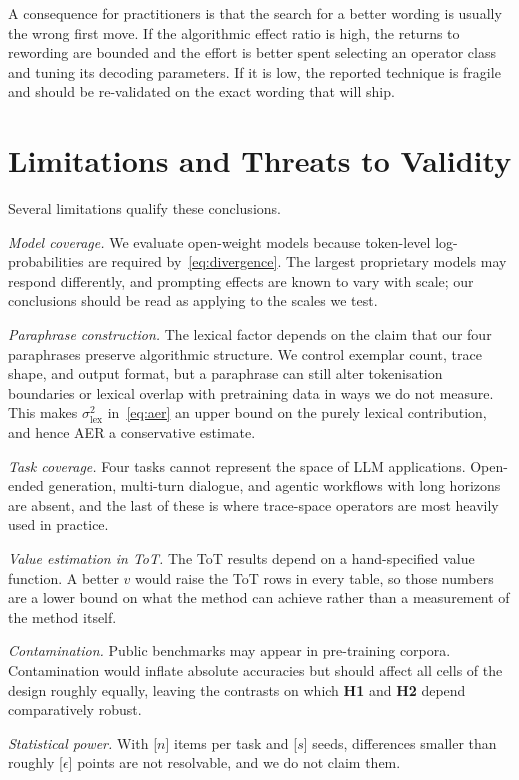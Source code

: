 \documentclass[conference]{IEEEtran}
\begin{document}
A consequence for practitioners is that the search for a better wording is usually the wrong first move. If the algorithmic effect ratio is high, the returns to rewording are bounded and the effort is better spent selecting an operator class and tuning its decoding parameters. If it is low, the reported technique is fragile and should be re-validated on the exact wording that will ship.

\section{Limitations and Threats to Validity}
\label{sec:limitations}

Several limitations qualify these conclusions.

\textit{Model coverage.} We evaluate open-weight models because token-level log-probabilities are required by~\eqref{eq:divergence}. The largest proprietary models may respond differently, and prompting effects are known to vary with scale; our conclusions should be read as applying to the scales we test.

\textit{Paraphrase construction.} The lexical factor depends on the claim that our four paraphrases preserve algorithmic structure. We control exemplar count, trace shape, and output format, but a paraphrase can still alter tokenisation boundaries or lexical overlap with pretraining data in ways we do not measure. This makes $\sigma_{\text{lex}}^{2}$ in~\eqref{eq:aer} an upper bound on the purely lexical contribution, and hence AER a conservative estimate.

\textit{Task coverage.} Four tasks cannot represent the space of LLM applications. Open-ended generation, multi-turn dialogue, and agentic workflows with long horizons are absent, and the last of these is where trace-space operators are most heavily used in practice.

\textit{Value estimation in ToT.} The ToT results depend on a hand-specified value function. A better $v$ would raise the ToT rows in every table, so those numbers are a lower bound on what the method can achieve rather than a measurement of the method itself.

\textit{Contamination.} Public benchmarks may appear in pre-training corpora. Contamination would inflate absolute accuracies but should affect all cells of the design roughly equally, leaving the contrasts on which \textbf{H1} and \textbf{H2} depend comparatively robust.

\textit{Statistical power.} With \textcolor{BrickRed}{[$n$]} items per task and \textcolor{BrickRed}{[$s$]} seeds, differences smaller than roughly \textcolor{BrickRed}{[$\epsilon$]} points are not resolvable, and we do not claim them.
\end{document}
